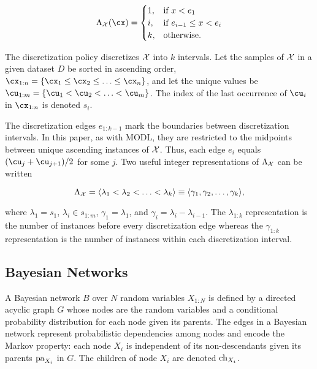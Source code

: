 \begin{equation}
  \Lambda_{\cX}(\cx) = \begin{cases}
    1, & \text{if $x<e_1$}\\
    i, & \text{if $e_{i-1} \leq x < e_i$}\\
    k, & \text{otherwise.}
  \end{cases}
\end{equation}

\noindent
The discretization policy discretizes $\mathcal{X}$ into $k$ intervals.
Let the samples of $\mathcal{X}$ in a given dataset $D$ be sorted in ascending order, ${\cx_{1:n} = \curly{\cx_1 \leq \cx_2 \leq \ldots \leq \cx_n}}$, and let the unique values be ${\cu_{1:m} = \curly{\cu_1 < \cu_2 < \ldots < \cu_{m}}}$.
The index of the last occurrence of $\cu_i$ in $\cx_{1:n}$ is denoted $s_i$.

The discretization edges $e_{1:k-1}$ mark the boundaries between discretization intervals.
In this paper, as with MODL, they are restricted to the midpoints between unique ascending instances of $\mathcal{X}$.
Thus, each edge $e_i$ equals $\paren{\cu_{j} + \cu_{{j+1}}}/2$ for some $j$.
Two useful integer representations of $\Lambda_{\mathcal{X}}$ can be written

\begin{equation}
\label{eq:disc_def}
  \Lambda_{\mathcal{X}} = \langle \lambda_1 < \lambda_2  < \ldots < \lambda_k \rangle \equiv \langle \gamma_1, \gamma_2, \ldots, \gamma_k \rangle\text{,}
\end{equation}

\noindent
where $\lambda_1 = s_1$, $\lambda_i \in s_{1:m}$, $\gamma_1 = \lambda_1$, and $\gamma_i = \lambda_i - \lambda_{i-1}$.
The $\lambda_{1:k}$ representation is the number of instances before every discretization edge whereas the $\gamma_{1:k}$ representation is the number of instances within each discretization interval.

\subsection{Bayesian Networks}

A Bayesian network $B$ over $N$ random variables $X_{1:N}$ is defined by a directed acyclic graph $G$ whose nodes are the random variables and a conditional probability distribution for each node given its parents.
The edges in a Bayesian network represent probabilistic dependencies among nodes and encode the Markov property: each node $X_i$ is independent of its non-descendants given its parents $\operatorname{pa}_{X_i}$ in $G$.
The children of node $X_i$ are denoted $\operatorname{ch}_{X_i}$.

